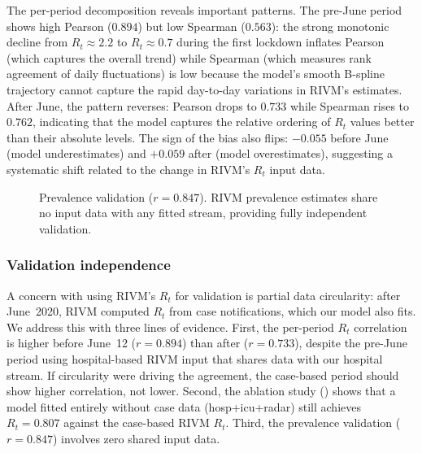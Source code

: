 \documentclass[11pt]{article}
\begin{document}
The per-period decomposition reveals important patterns. The pre-June period shows high Pearson ($0.894$) but low Spearman ($0.563$): the strong monotonic decline from $R_t\approx 2.2$ to $R_t\approx 0.7$ during the first lockdown inflates Pearson (which captures the overall trend) while Spearman (which measures rank agreement of daily fluctuations) is low because the model's smooth B-spline trajectory cannot capture the rapid day-to-day variations in RIVM's estimates. After June, the pattern reverses: Pearson drops to $0.733$ while Spearman rises to $0.762$, indicating that the model captures the relative ordering of $R_t$ values better than their absolute levels. The sign of the bias also flips: $-0.055$ before June (model underestimates) and $+0.059$ after (model overestimates), suggesting a systematic shift related to the change in RIVM's $R_t$ input data.

\begin{figure}[ht]
\centering
{}
\caption{Prevalence validation ($r=0.847$). RIVM prevalence estimates share no input data with any fitted stream, providing fully independent validation.}\label{fig:prev}
\end{figure}

\subsubsection{Validation independence}\label{sec:results:independence}

A concern with using RIVM's $R_t$ for validation is partial data circularity: after June~2020, RIVM computed $R_t$ from case notifications, which our model also fits. We address this with three lines of evidence. First, the per-period $R_t$ correlation is higher before June~12 ($r=0.894$) than after ($r=0.733$), despite the pre-June period using hospital-based RIVM input that shares data with our hospital stream. If circularity were driving the agreement, the case-based period should show higher correlation, not lower. Second, the ablation study () shows that a model fitted entirely without case data (hosp+icu+radar) still achieves $R_t=0.807$ against the case-based RIVM $R_t$. Third, the prevalence validation ($r=0.847$) involves zero shared input data.
\end{document}
